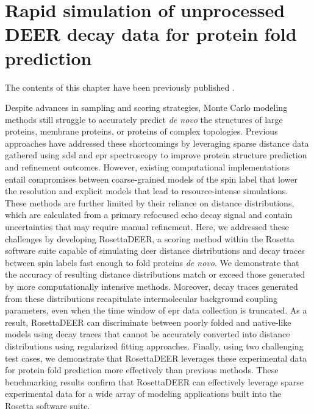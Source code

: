 \clearpage %

\chapter{Rapid simulation of unprocessed DEER decay data for protein fold prediction}\label{ch:rosettadeer}

The contents of this chapter have been previously published \citep*{DelAlamo2020}.

\bigskip

Despite advances in sampling and scoring strategies, Monte Carlo modeling methods still struggle to accurately predict \emph{de novo} the structures of large proteins, membrane proteins, or proteins of complex topologies. Previous approaches have addressed these shortcomings by leveraging sparse distance data gathered using \gls{sdsl} and \gls{epr} spectroscopy to improve protein structure prediction and refinement outcomes. However, existing computational implementations entail compromises between coarse-grained models of the spin label that lower the resolution and explicit models that lead to resource-intense simulations. These methods are further limited by their reliance on distance distributions, which are calculated from a primary refocused echo decay signal and contain uncertainties that may require manual refinement. Here, we addressed these challenges by developing RosettaDEER, a scoring method within the Rosetta software suite capable of simulating \gls{deer} distance distributions and decay traces between spin labels fast enough to fold proteins \emph{de novo}. We demonstrate that the accuracy of resulting distance distributions match or exceed those generated by more computationally intensive methods. Moreover, decay traces generated from these distributions recapitulate intermolecular background coupling parameters, even when the time window of \gls{epr} data collection is truncated. As a result, RosettaDEER can discriminate between poorly folded and native-like models using decay traces that cannot be accurately converted into distance distributions using regularized fitting approaches. Finally, using two challenging test cases, we demonstrate that RosettaDEER leverages these experimental data for protein fold prediction more effectively than previous methods. These benchmarking results confirm that RosettaDEER can effectively leverage sparse experimental data for a wide array of modeling applications built into the Rosetta software suite.

